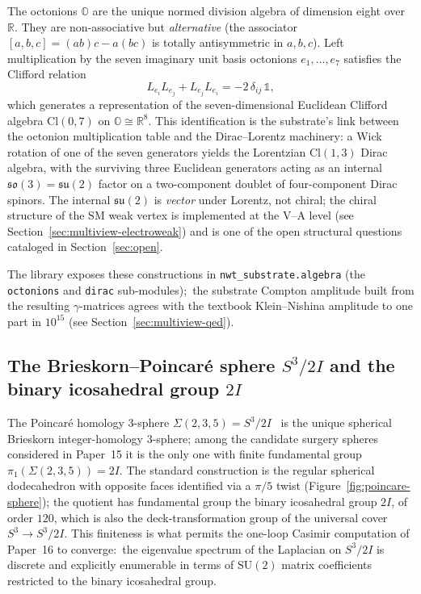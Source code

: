 \documentclass[11pt]{article}
\newcommand{\su}{\mathfrak{su}}
\newcommand{\so}{\mathfrak{so}}
\newcommand{\R}{\mathbb{R}}
\newcommand{\SU}{\mathrm{SU}}
\begin{document}
The octonions $\mathbb{O}$ are the unique normed division algebra of
dimension eight over $\R$.  They are non-associative but
\emph{alternative} (the associator $[a,b,c] = (ab)c - a(bc)$ is
totally antisymmetric in $a,b,c$).  Left multiplication by the seven
imaginary unit basis octonions $e_1, \dots, e_7$ satisfies the
Clifford relation
\begin{equation}
  L_{e_i} L_{e_j} + L_{e_j} L_{e_i} = -2\,\delta_{ij}\,\mathbb{1},
\end{equation}
which generates a representation of the seven-dimensional Euclidean
Clifford algebra $\mathrm{Cl}(0,7)$ on $\mathbb{O} \cong \R^8$.
This identification is the substrate's link between the octonion
multiplication table and the Dirac--Lorentz machinery: a Wick
rotation of one of the seven generators yields the
Lorentzian $\mathrm{Cl}(1,3)$ Dirac algebra, with the surviving
three Euclidean generators acting as an internal $\so(3) = \su(2)$
factor on a two-component doublet of four-component Dirac spinors.
The internal $\su(2)$ is \emph{vector} under Lorentz, not chiral;
the chiral structure of the SM weak vertex is implemented at the
V--A level (see Section~\ref{sec:multiview-electroweak}) and is one
of the open structural questions cataloged in
Section~\ref{sec:open}.

The library exposes these constructions in
\texttt{nwt\_substrate.algebra} (the \texttt{octonions} and
\texttt{dirac} sub-modules);\ the substrate Compton
amplitude built from the resulting $\gamma$-matrices agrees with
the textbook Klein--Nishina amplitude to one part in $10^{15}$
(see Section~\ref{sec:multiview-qed}).

\subsection{The Brieskorn--Poincar\'e sphere $S^3/2I$ and the
binary icosahedral group $2I$}

The Poincar\'e homology $3$-sphere
$\Sigma(2,3,5) = S^3/2I$~\cite{poincare1904, brieskorn1966} is the
unique spherical Brieskorn integer-homology $3$-sphere; among the
candidate surgery spheres considered in Paper~15 it is the only
one with finite fundamental group $\pi_1(\Sigma(2,3,5)) = 2I$.
The standard construction is the regular spherical dodecahedron
with opposite faces identified via a $\pi/5$ twist
(Figure~\ref{fig:poincare-sphere}); the quotient has fundamental
group the binary icosahedral group $2I$, of order $120$, which is
also the deck-transformation group of the universal cover
$S^3 \to S^3/2I$.  This finiteness is what permits the one-loop
Casimir computation of Paper~16 to converge:\ the eigenvalue
spectrum of the Laplacian on $S^3/2I$ is discrete and explicitly
enumerable in terms of $\SU(2)$ matrix coefficients restricted to
the binary icosahedral group.
\end{document}
